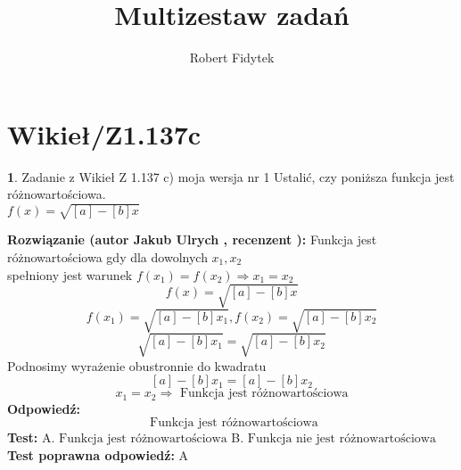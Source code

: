 \documentclass[12pt, a4paper]{article}
\title{Multizestaw zadań}
\author{Robert Fidytek}
\date{}
\theoremstyle{definition} %
\newtheorem{zad}{}
\newcommand{\kategoria}[1]{\section{#1}} %
\newcommand{\zadStart}[1]{\begin{zad}#1\newline} %
\newcommand{\zadStop}{\end{zad}}   %
\newcommand{\rozwStart}[2]{\noindent \textbf{Rozwiązanie (autor #1 , recenzent #2): }\newline} %
\newcommand{\rozwStop}{\newline}                                            %
\newcommand{\odpStart}{\noindent \textbf{Odpowiedź:}\newline}    %
\newcommand{\odpStop}{\newline}                                             %
\newcommand{\testStart}{\noindent \textbf{Test:}\newline} %
\newcommand{\testStop}{\newline} %
\newcommand{\kluczStart}{\noindent \textbf{Test poprawna odpowiedź:}\newline} %
\newcommand{\kluczStop}{\newline} %
\begin{document}
\maketitle


\kategoria{Wikieł/Z1.137c}
\zadStart{Zadanie z Wikieł Z 1.137 c) moja wersja nr 1}
Ustalić, czy poniższa funkcja jest różnowartościowa.\\ $f(x)=\sqrt{[a]-[b]x}$
\zadStop
\rozwStart{Jakub Ulrych}{}
Funkcja jest różnowartościowa gdy dla dowolnych $x_{1},x_{2}$\\ spełniony jest warunek $f(x_{1})=f(x_{2})\Rightarrow x_{1}=x_{2}$
$$f(x)=\sqrt{[a]-[b]x}$$
$$f(x_{1})=\sqrt{[a]-[b]x_{1}},f(x_{2})=\sqrt{[a]-[b]x_{2}}$$
$$\sqrt{[a]-[b]x_{1}}=\sqrt{[a]-[b]x_{2}}$$
Podnosimy wyrażenie obustronnie do kwadratu
$$[a]-[b]x_{1}=[a]-[b]x_{2}$$
$$x_{1}=x_{2}\Rightarrow\text{ Funkcja jest różnowartościowa}$$
\rozwStop
\odpStart
$$\text{ Funkcja jest różnowartościowa}$$
\odpStop
\testStart
A.$\text{ Funkcja jest różnowartościowa}$
B.$\text{ Funkcja nie jest różnowartościowa}$
\testStop
\kluczStart
A
\kluczStop
\end{document}
